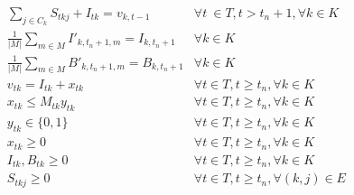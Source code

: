 \documentclass[10pt]{article}
\newcommand{\ti}{t} %
\newcommand{\ka}{k} %
\newcommand{\jey}{j} %
\begin{document}
\begin{subequations}
\begin{flalign}
&  \sum_{j\in C_{k}} {S}_{\ti \ka \jey} + I_{\ti \ka} = v_{k,t-1} &\forall t \ \in T, t > t_{n}+1,\forall k \in K  &     \label{eq:Det_inventory_ext}&\\
& \frac{1}{|M|} \sum_{m \in M} I'_{k,t_n+1,m} = I_{k,t_n+1} & \forall k \in K & \label{eq:Average_Inventory} \\
& \frac{1}{|M|} \sum_{m \in M} B'_{k,t_n+1,m} = B_{k,t_n+1} & \forall k \in K & \label{eq:Average_Backlog}\\
& v_{\ti \ka} = I_{\ti \ka} + x_{\ti \ka}  \quad &\forall t \in T, t \geq t_n, \forall k \in K \\
&x_{\ti \ka} \leq M_{\ti \ka} y_{\ti \ka} &  \forall t  \in T , t \geq t_n  , \forall k \in K & \label{eq:Sub_FD_Setup}\\
&y_{\ti \ka} \in \{0, 1\} & \forall t  \in T,  t \geq t_n ,\forall k \in K &\label{eq:Sub_FD_base_bin}\\
&x_{\ti \ka}  \geq 0 &  \forall t  \in T, t\geq t_n, \forall k \in K  & \label{eq:Sub_FD_bound1}\\
& I_{\ti \ka} , B_{\ti \ka} \geq 0 &  \forall t  \in T,  t \geq t_n , \forall k \in K  & \label{eq:Sub_FD_bound2}\\
&S_{\ti \ka \jey} \geq 0 &  \forall t  \in T,  t \geq t_n , \forall(k,j) \in E  & \label{eq:Sub_FD_bound3}
\end{flalign}

  \end{subequations}
  
\end{document}
